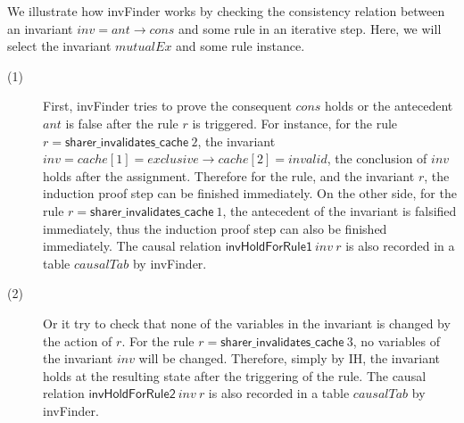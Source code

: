 \documentclass{llncs}
\begin{document}
We illustrate how {\sf invFinder} works by checking the consistency relation between
an invariant $inv=ant \longrightarrow cons$ and some rule in an iterative step.
Here, we will select the invariant $mutualEx$ and some rule instance.
%
\begin{description}
\item[(1)]   First, {\sf invFinder} tries to prove the consequent $cons$ holds or the
antecedent $ant$ is false after the rule $r$ is triggered.
    For instance, for the rule $r=\mathsf{sharer\_invalidates\_cache}~ 2$,
    the invariant $inv=cache[1] = exclusive \longrightarrow  cache[2] =invalid$,
    the conclusion of $inv$ holds after the assignment. Therefore for the rule, and the invariant $r$, the induction proof step can be  finished immediately.
    On the other side, for the rule $r=\mathsf{sharer\_invalidates\_cache}~1$, the antecedent of the invariant is falsified immediately, thus the induction
    proof step can also  be  finished immediately. The causal
    relation $\mathsf{invHoldForRule1}~inv~r$ is also recorded in a
    table $causalTab$ by {\sf invFinder}.

\item[(2)]  Or it try to check that none of the variables in the invariant is changed by the action of $r$.
For the rule $r=\mathsf{sharer\_invalidates\_cache}~ 3$, no
variables of the invariant $inv$ will be changed. Therefore, simply
by IH, the invariant holds at the resulting state
after the triggering of the rule. The causal
    relation $\mathsf{invHoldForRule2}~inv~r$ is also recorded in a
    table $causalTab$ by {\sf invFinder}.



\end{description}
\end{document}
